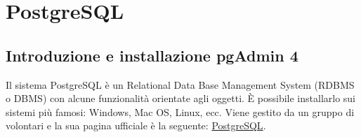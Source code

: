 \documentclass[a4paper]{article}
\begin{document}

	\newpage
	\section{PostgreSQL}
	
	\subsection{Introduzione e installazione pgAdmin 4}
	
	Il sistema PostgreSQL è un Relational Data Base Management System (RDBMS o DBMS) con alcune funzionalità orientate agli oggetti. È possibile installarlo sui sistemi più famosi: Windows, Mac OS, Linux, ecc. Viene gestito da un gruppo di volontari e la sua pagina ufficiale è la seguente: \href{https://www.postgresql.org/}{PostgreSQL}.\newline
	
\end{document}
